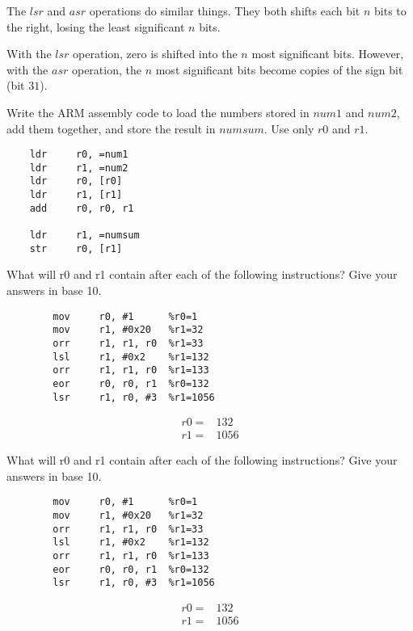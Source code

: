 \documentclass[12pt]{article}
\newenvironment{solution}[2][Solution]{\begin{trivlist}
\item[\hskip \labelsep {\bfseries #1}]}{\end{trivlist}}
\newenvironment{problem}[2][Problem]{\begin{trivlist}
\item[\hskip \labelsep {\bfseries #1}\hskip \labelsep {\bfseries #2.}]}{\end{trivlist}}
\begin{document}
The $lsr$ and $asr$ operations do similar things. They both shifts each bit $n$ bits to the right, losing the least significant $n$ bits.

With the $lsr$ operation, zero is shifted into the $n$ most significant bits.
However, with the $asr$ operation, the $n$ most significant bits become copies of the sign bit (bit $31$).


\begin{problem}{4.4}
    Write the ARM assembly code to load the numbers stored in $num1$ and $num2$, add them together, and store the result in $numsum$. Use only $r0$ and $r1$.
\end{problem}

\begin{verbatim}
    ldr     r0, =num1
    ldr     r1, =num2
    ldr     r0, [r0]
    ldr     r1, [r1]
    add     r0, r0, r1
    
    ldr     r1, =numsum
    str     r0, [r1]
\end{verbatim}


\begin{problem}{4.2}
    What will r0 and r1 contain after each of the following instructions? Give your answers in base 10.
    \begin{verbatim}
        mov     r0, #1      %r0=1
        mov     r1, #0x20   %r1=32
        orr     r1, r1, r0  %r1=33
        lsl     r1, #0x2    %r1=132
        orr     r1, r1, r0  %r1=133
        eor     r0, r0, r1  %r0=132
        lsr     r1, r0, #3  %r1=1056
    \end{verbatim}

\end{problem}

\begin{solution}{}
    \begin{align*}
        r0 = & 132 \\
        r1 = & 1056
    \end{align*}
\end{solution}


\begin{problem}{4.2}
    What will r0 and r1 contain after each of the following instructions? Give your answers in base 10.
    \begin{verbatim}
        mov     r0, #1      %r0=1
        mov     r1, #0x20   %r1=32
        orr     r1, r1, r0  %r1=33
        lsl     r1, #0x2    %r1=132
        orr     r1, r1, r0  %r1=133
        eor     r0, r0, r1  %r0=132
        lsr     r1, r0, #3  %r1=1056
    \end{verbatim}

\end{problem}

\begin{solution}{}
    \begin{align*}
        r0 = & 132 \\
        r1 = & 1056
    \end{align*}
\end{solution}
\end{document}
